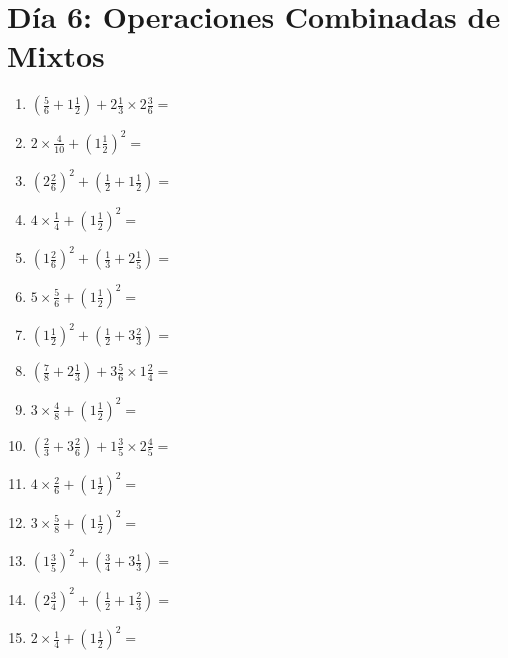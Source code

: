 \documentclass[12pt]{article}
\begin{document}
\section*{Día 6: Operaciones Combinadas de Mixtos}
\begin{enumerate}
\item \large $ (\frac{5}{6} + 1 \frac{1}{2}) + 2 \frac{1}{3} \times 2 \frac{3}{6} = $ \vspace{1.8cm}
\item \large $ 2 \times \frac{4}{10} + (1 \frac{1}{2})^2 = $ \vspace{1.8cm}
\item \large $ (2 \frac{2}{6})^2 + (\frac{1}{2} + 1 \frac{1}{2}) = $ \vspace{1.8cm}
\item \large $ 4 \times \frac{1}{4} + (1 \frac{1}{2})^2 = $ \vspace{1.8cm}
\item \large $ (1 \frac{2}{6})^2 + (\frac{1}{3} + 2 \frac{1}{5}) = $ \vspace{1.8cm}
\item \large $ 5 \times \frac{5}{6} + (1 \frac{1}{2})^2 = $ \vspace{1.8cm}
\item \large $ (1 \frac{1}{2})^2 + (\frac{1}{2} + 3 \frac{2}{3}) = $ \vspace{1.8cm}
\item \large $ (\frac{7}{8} + 2 \frac{1}{3}) + 3 \frac{5}{6} \times 1 \frac{2}{4} = $ \vspace{1.8cm}
\item \large $ 3 \times \frac{4}{8} + (1 \frac{1}{2})^2 = $ \vspace{1.8cm}
\item \large $ (\frac{2}{3} + 3 \frac{2}{6}) + 1 \frac{3}{5} \times 2 \frac{4}{5} = $ \vspace{1.8cm}
\newpage
\item \large $ 4 \times \frac{2}{6} + (1 \frac{1}{2})^2 = $ \vspace{1.8cm}
\item \large $ 3 \times \frac{5}{8} + (1 \frac{1}{2})^2 = $ \vspace{1.8cm}
\item \large $ (1 \frac{3}{5})^2 + (\frac{3}{4} + 3 \frac{1}{3}) = $ \vspace{1.8cm}
\item \large $ (2 \frac{3}{4})^2 + (\frac{1}{2} + 1 \frac{2}{3}) = $ \vspace{1.8cm}
\item \large $ 2 \times \frac{1}{4} + (1 \frac{1}{2})^2 = $ \vspace{1.8cm}

\end{enumerate}
\end{document}
